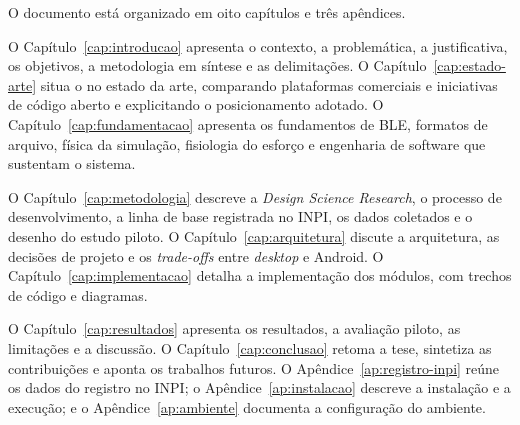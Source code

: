 O documento está organizado em oito capítulos e três apêndices.

O Capítulo~\ref{cap:introducao} apresenta o contexto, a problemática, a
justificativa, os objetivos, a metodologia em síntese e as delimitações. O
Capítulo~\ref{cap:estado-arte} situa o \argus{} no estado da arte, comparando
plataformas comerciais e iniciativas de código aberto e explicitando o
posicionamento adotado. O Capítulo~\ref{cap:fundamentacao} apresenta os
fundamentos de BLE, formatos de arquivo, física da simulação, fisiologia do
esforço e engenharia de software que sustentam o sistema.

O Capítulo~\ref{cap:metodologia} descreve a \textit{Design Science Research}, o
processo de desenvolvimento, a linha de base registrada no INPI, os dados
coletados e o desenho do estudo piloto. O Capítulo~\ref{cap:arquitetura}
discute a arquitetura, as decisões de projeto e os \textit{trade-offs} entre
\textit{desktop} e Android. O Capítulo~\ref{cap:implementacao} detalha a
implementação dos módulos, com trechos de código e diagramas.

O Capítulo~\ref{cap:resultados} apresenta os resultados, a avaliação piloto, as
limitações e a discussão. O Capítulo~\ref{cap:conclusao} retoma a tese,
sintetiza as contribuições e aponta os trabalhos futuros. O
Apêndice~\ref{ap:registro-inpi} reúne os dados do registro no INPI; o
Apêndice~\ref{ap:instalacao} descreve a instalação e a execução; e o
Apêndice~\ref{ap:ambiente} documenta a configuração do ambiente.
